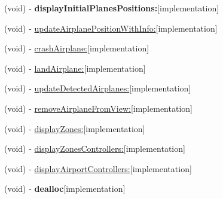 \begin{DoxyCompactItemize}
\item 
\hypertarget{interface_main_interface_controller_ab43a3f8d7edb2042bab5edd88d40f733}{
(void) -\/ {\bfseries display\-Initial\-Planes\-Positions\-:}{\ttfamily  \mbox{[}implementation\mbox{]}}}
\label{interface_main_interface_controller_ab43a3f8d7edb2042bab5edd88d40f733}

\item 
(void) -\/ \hyperlink{interface_main_interface_controller_a5042fa0b3900c0bfc1675c7e4c2f543c}{update\-Airplane\-Position\-With\-Info\-:}{\ttfamily  \mbox{[}implementation\mbox{]}}
\item 
(void) -\/ \hyperlink{interface_main_interface_controller_addd298361074e8a3207a0bddc49761a7}{crash\-Airplane\-:}{\ttfamily  \mbox{[}implementation\mbox{]}}
\item 
(void) -\/ \hyperlink{interface_main_interface_controller_af64c767f0f772be18d81f0acdc89eee4}{land\-Airplane\-:}{\ttfamily  \mbox{[}implementation\mbox{]}}
\item 
(void) -\/ \hyperlink{interface_main_interface_controller_af31c85000f2413e42fe7dd7d00496145}{update\-Detected\-Airplanes\-:}{\ttfamily  \mbox{[}implementation\mbox{]}}
\item 
(void) -\/ \hyperlink{interface_main_interface_controller_aa7777383a451c23cfa33ee5e37e91748}{remove\-Airplane\-From\-View\-:}{\ttfamily  \mbox{[}implementation\mbox{]}}
\item 
(void) -\/ \hyperlink{interface_main_interface_controller_ae14023cc7de445df3cf7eb4896bd0ebb}{display\-Zones\-:}{\ttfamily  \mbox{[}implementation\mbox{]}}
\item 
(void) -\/ \hyperlink{interface_main_interface_controller_ae220e22c13557f58e6f6227264ac629f}{display\-Zones\-Controllers\-:}{\ttfamily  \mbox{[}implementation\mbox{]}}
\item 
(void) -\/ \hyperlink{interface_main_interface_controller_ac8775a5e51cb7e092c2d740c8a450b8c}{display\-Airport\-Controllers\-:}{\ttfamily  \mbox{[}implementation\mbox{]}}
\item 
\hypertarget{interface_main_interface_controller_ac6bfa03c1c8cc36563eadd8b02f32669}{
(void) -\/ {\bfseries dealloc}{\ttfamily  \mbox{[}implementation\mbox{]}}}
\label{interface_main_interface_controller_ac6bfa03c1c8cc36563eadd8b02f32669}

\end{DoxyCompactItemize}
